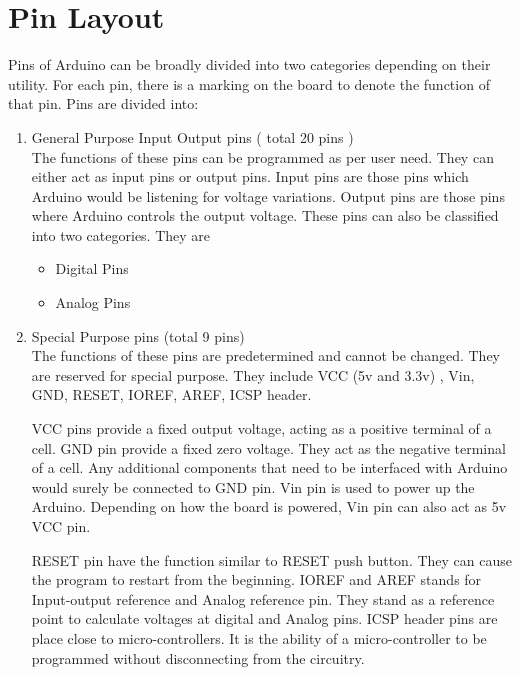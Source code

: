 \section{Pin Layout}
Pins of Arduino can be broadly divided into two categories depending on their utility. For each pin, there is a marking on the board to denote the function of that pin. Pins are divided into:
\begin{enumerate}
    \item General Purpose Input Output pins ( total 20 pins )\\ 
    The functions of these pins can be programmed as per user need. They can either act as input pins or output pins. Input pins are those pins which Arduino would be listening for voltage variations. Output pins are those pins where Arduino controls the output voltage. These pins can also be classified into two categories. They are 
    \begin{itemize}
        \item Digital Pins
        \item Analog Pins
    \end{itemize}
    
    \item Special Purpose pins (total 9 pins)\\
    The functions of these pins are predetermined and cannot be changed. They are reserved for special purpose. They include VCC (5v and 3.3v) , Vin, GND, RESET, IOREF, AREF, ICSP header.
    
    \par VCC pins provide a fixed output voltage, acting as a positive terminal of a cell. GND pin provide a fixed zero voltage. They act as the negative terminal of a cell. Any additional components that need to be interfaced with Arduino would surely be connected to GND pin. Vin pin is used to power up the Arduino. Depending on how the board is powered, Vin pin can also act as 5v VCC pin.
    \par RESET pin have the function similar to RESET push button. They can cause the program to restart from the beginning. IOREF and AREF stands for Input-output reference and Analog reference pin. They stand as a reference point to calculate voltages at digital and Analog pins. \ac{ICSP} header pins are place close to micro-controllers. It is the ability of a micro-controller to be programmed without disconnecting from the circuitry.
\end{enumerate}

